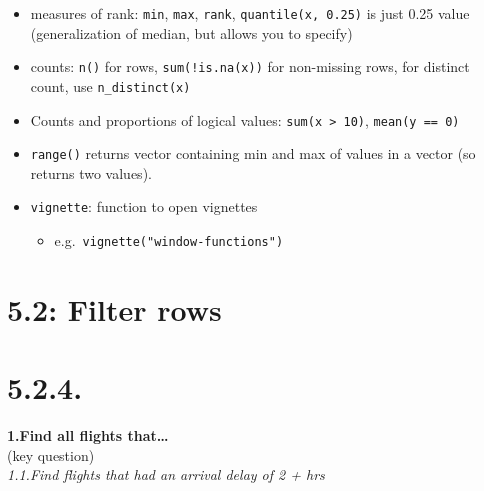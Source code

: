 \documentclass[]{book}
\newenvironment{Shaded}{\begin{snugshade}}{\end{snugshade}}
\newcommand{\DecValTok}[1]{\textcolor[rgb]{0.00,0.00,0.81}{#1}}
\newcommand{\KeywordTok}[1]{\textcolor[rgb]{0.13,0.29,0.53}{\textbf{#1}}}
\newcommand{\NormalTok}[1]{#1}
\newcommand{\OperatorTok}[1]{\textcolor[rgb]{0.81,0.36,0.00}{\textbf{#1}}}
\newcommand{\StringTok}[1]{\textcolor[rgb]{0.31,0.60,0.02}{#1}}
\providecommand{\tightlist}{%
  \setlength{\itemsep}{0pt}\setlength{\parskip}{0pt}}
\theoremstyle{definition}
\theoremstyle{definition}
\theoremstyle{definition}
\theoremstyle{remark}
\begin{document}
\begin{itemize}
\tightlist
\item
  measures of rank: \texttt{min}, \texttt{max}, \texttt{rank},
  \texttt{quantile(x,\ 0.25)} is just 0.25 value (generalization of
  median, but allows you to specify)\\
\item
  counts: \texttt{n()} for rows, \texttt{sum(!is.na(x))} for non-missing
  rows, for distinct count, use \texttt{n\_distinct(x)}
\item
  Counts and proportions of logical values:
  \texttt{sum(x\ \textgreater{}\ 10)}, \texttt{mean(y\ ==\ 0)}
\item
  \texttt{range()} returns vector containing min and max of values in a
  vector (so returns two values).\\
\item
  \texttt{vignette}: function to open vignettes

  \begin{itemize}
  \tightlist
  \item
    e.g.~\texttt{vignette("window-functions")}
  \end{itemize}
\end{itemize}

\hypertarget{filter-rows}{%
\section{5.2: Filter rows}\label{filter-rows}}

\hypertarget{section-7}{%
\section{5.2.4.}\label{section-7}}

\textbf{1.Find all flights that\ldots{}}\\
(key question)\\
\emph{1.1.Find flights that had an arrival delay of 2 + hrs}

\begin{Shaded}
\end{Shaded}
\end{document}
